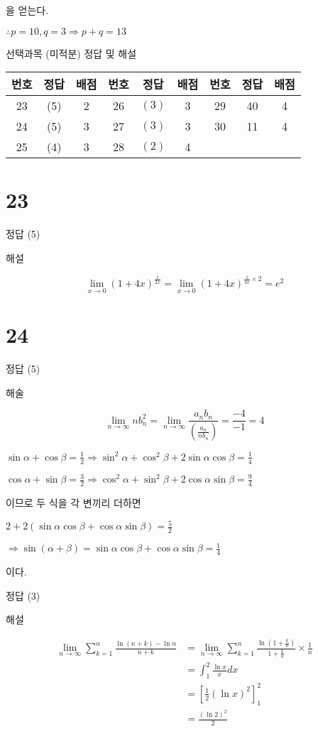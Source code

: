 \documentclass[10pt]{article}
\begin{document}
을 얻는다.

\(\therefore p=10, q=3 \Rightarrow p+q=13\)

선택과목 (미적분) 정답 및 해설

\begin{center}
\begin{tabular}{|c|c|c|c|c|c|c|c|c|}
\hline
번호 & 정답 & 배점 & 번호 & 정답 & 배점 & 번호 & 정답 & 배점 \\
\hline
23 & (5) & 2 & 26 & \((3)\) & 3 & 29 & 40 & 4 \\
\hline
24 & (5) & 3 & 27 & \((3)\) & 3 & 30 & 11 & 4 \\
\hline
25 & (4) & 3 & 28 & \((2)\) & 4 &  &  &  \\
\hline
\end{tabular}
\end{center}

\section*{23}
정답 (5)

해설

\[
\lim _{x \rightarrow 0}(1+4 x)^{\frac{1}{2 x}}=\lim _{x \rightarrow 0}(1+4 x)^{\frac{1}{4 x} \times 2}=e^{2}
\]

\section*{24}
정답 (5)

해술

\[
\lim _{n \rightarrow \infty} n b_{n}^{2}=\lim _{n \rightarrow \infty} \frac{a_{n} b_{n}}{\left(\frac{a_{n}}{n b_{n}}\right)}=\frac{-4}{-1}=4
\]

\(\sin \alpha+\cos \beta=\frac{1}{2} \Rightarrow \sin ^{2} \alpha+\cos ^{2} \beta+2 \sin \alpha \cos \beta=\frac{1}{4}\)

\(\cos \alpha+\sin \beta=\frac{3}{2} \Rightarrow \cos ^{2} \alpha+\sin ^{2} \beta+2 \cos \alpha \sin \beta=\frac{9}{4}\)

이므로 두 식을 각 변끼리 더하면

\(2+2(\sin \alpha \cos \beta+\cos \alpha \sin \beta)=\frac{5}{2}\)

\(\Rightarrow \sin (\alpha+\beta)=\sin \alpha \cos \beta+\cos \alpha \sin \beta=\frac{1}{4}\)

이다.

정답 (3)

해설

\[
\begin{aligned}
\lim _{n \rightarrow \infty} \sum_{k=1}^{n} \frac{\ln (n+k)-\ln n}{n+k} & =\lim _{n \rightarrow \infty} \sum_{k=1}^{n} \frac{\ln \left(1+\frac{k}{n}\right)}{1+\frac{k}{n}} \times \frac{1}{n} \\
& =\int_{1}^{2} \frac{\ln x}{x} d x \\
& =\left[\frac{1}{2}(\ln x)^{2}\right]_{1}^{2} \\
& =\frac{(\ln 2)^{2}}{2}
\end{aligned}
\]
\end{document}
